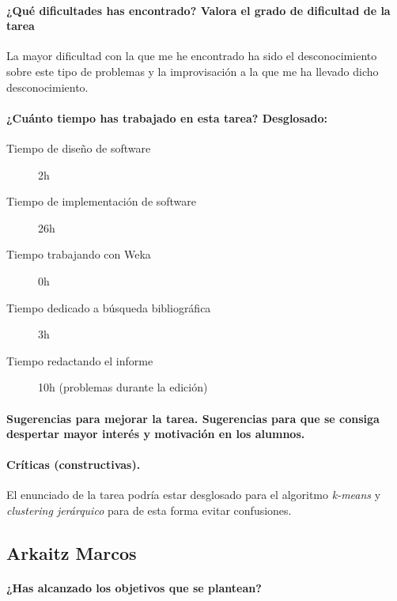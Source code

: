 \documentclass[11pt, titlepage,a4paper]{article}
\begin{document}
\paragraph{¿Qué dificultades has encontrado? Valora el grado de dificultad de
la tarea\\}
La mayor dificultad con la que me he encontrado ha sido el desconocimiento sobre
este tipo de problemas y la improvisación a la que me ha llevado dicho desconocimiento.

\paragraph{¿Cuánto tiempo has trabajado en esta tarea? Desglosado:\\}
\begin{description}
	\item[Tiempo de diseño de software] 2h
	\item[Tiempo de implementación de software] 26h
	\item[Tiempo trabajando con Weka] 0h
	\item[Tiempo dedicado a búsqueda bibliográfica] 3h
	\item[Tiempo redactando el informe] 10h (problemas durante la edición)
\end{description}

\paragraph{Sugerencias para mejorar la tarea. Sugerencias para que se consiga despertar mayor
interés y motivación en los alumnos.\\}

\paragraph{Críticas (constructivas).\\}
El enunciado de la tarea podría estar desglosado para el algoritmo
\textit{k-means} y \textit{clustering jerárquico} para de esta forma evitar confusiones.

\subsection{Arkaitz Marcos}
\paragraph{¿Has alcanzado los objetivos que se plantean?\\}
\end{document}
